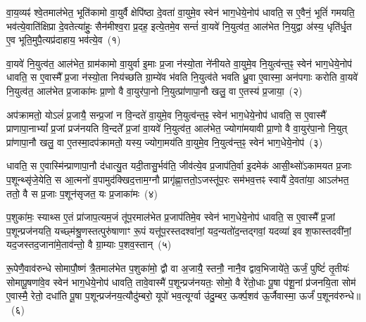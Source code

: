 \setcounter{anuvakam}{0}
वा॒य॒व्यꣴ॑ श्वे॒तमा\-ल॑भेत॒ भूति॑कामो वा॒युर्वै क्षेपि॑ष्ठा दे॒वता॑ वा॒युमे॒व स्वेन॑ भाग॒\-धेये॒नोप॑ धावति॒ स ए॒वैनं॒ भूतिं॑ गमयति॒ भव॑त्ये॒वाति॑क्षिप्रा दे॒वतेत्या॑हुः॒ सैन॑मीश्व॒रा प्र॒दह॒ इत्ये॒तमे॒व सन्तं॑ वा॒यवे॑ नि॒युत्व॑त॒ आल॑भेत नि॒युद्वा अ॑स्य॒ धृति॑र्धृ॒त ए॒व भूति॒मुपै॒त्यप्र॑दाहाय॒ भव॑त्ये॒व~(१)\ip

वा॒यवे॑ नि॒युत्व॑त॒ आ\-ल॑भेत॒ ग्राम॑कामो वा॒युर्वा इ॒माः प्र॒जा न॑स्यो॒ता ने॑नीयते वा॒युमे॒व नि॒युत्व॑न्त॒ꣴ॒ स्वेन॑ भाग॒\-धेये॒नोप॑ धावति॒ स ए॒वास्मै᳚ प्र॒जा न॑स्यो॒ता निय॑च्छति ग्रा॒म्ये॑व भ॑वति नि॒युत्व॑ते भवति ध्रु॒वा ए॒वास्मा॒ अन॑पगाः करोति वा॒यवे॑ नि॒युत्व॑त॒ आल॑भेत प्र॒जाका॑मः प्रा॒णो वै वा॒युर॑पा॒नो नि॒युत्प्रा॑णापा॒नौ खलु॒ वा ए॒तस्य॑ प्र॒जाया॒~(२)\ip

अप॑क्रामतो॒ यो\-ऽलं॑ प्र॒जायै॒ सन्प्र॒जां न वि॒न्दते॑ वा॒युमे॒व नि॒युत्व॑न्त॒ꣴ॒ स्वेन॑ भाग॒\-धेये॒नोप॑ धावति॒ स ए॒वास्मै᳚ प्राणापा॒ना\-भ्यां᳚ प्र॒जां प्रज॑नयति वि॒न्दते᳚ प्र॒जां वा॒यवे॑ नि॒युत्व॑त॒ आ\-ल॑भेत॒ ज्योगा॑मयावी प्रा॒णो वै वा॒युर॑पा॒नो नि॒युत् प्रा॑णापा॒नौ खलु॒ वा ए॒तस्मा॒दप॑क्रामतो॒ यस्य॒ ज्योगा॒मय॑ति वा॒युमे॒व नि॒युत्व॑न्त॒ꣴ॒ स्वेन॑ भाग॒\-धेये॒नोप॑~(३)\ip

धावति॒ स ए॒वास्मि॑न्प्राणापा॒नौ द॑धात्यु॒त यदी॒तासु॒र्भव॑ति॒ जीव॑त्ये॒व प्र॒जा\-प॑ति॒र्वा इ॒दमेक॑ आसी॒थ्सो॑\-ऽकामयत प्र॒जाः प॒शून्थ्सृ॑जे॒येति॒ स आ॒त्मनो॑ व॒पामुद॑क्खिद॒त्ताम॒ग्नौ प्रागृ॑ह्णा॒त्ततो॒\-ऽजस्तू॑प॒रः सम॑भव॒त्तꣴ स्वायै॑ दे॒वता॑या॒ आ\-ऽल॑भत॒ ततो॒ वै स प्र॒जाः प॒शून॑सृजत॒ यः प्र॒जाका॑मः~(४)\ip

प॒शुका॑मः॒ स्याथ्स ए॒तं प्रा॑जाप॒त्यम॒जं तू॑प॒रमाल॑भेत प्र॒जा\-प॑तिमे॒व स्वेन॑ भाग॒\-धेये॒नोप॑ धावति॒ स ए॒वास्मै᳚ प्र॒जां प॒शून्प्रज॑नयति॒ यच्छ्म॑श्रु॒णस्तत्पुरु॑षाणाꣳ रू॒पं यत्तू॑प॒रस्तदश्वा॑नां॒ यद॒न्यतो॑द॒न्तद्गवां॒ यदव्या॑ इव श॒फास्तदवी॑नां॒ यद॒ज\-स्तद॒जाना॑मे॒ताव॑न्तो॒ वै ग्रा॒म्याः प॒शव॒स्तान्~(५)\ip

रू॒पेणै॒वाव॑\-रुन्धे सोमापौ॒ष्णं त्रै॒तमाल॑भेत प॒शुका॑मो॒ द्वौ वा अ॒जायै॒ स्तनौ॒ नानै॒व द्वाव॒भिजाये॑ते॒ ऊर्जं॒ पुष्टिं॑ तृ॒तीयः॑ सोमापू॒षणा॑वे॒व स्वेन॑ भाग॒\-धेये॒नोप॑ धावति॒ तावे॒वास्मै॑ प॒शून्प्रज॑नयतः॒ सोमो॒ वै रे॑तो॒धाः पू॒षा प॑शू॒नां प्र॑जनयि॒ता सोम॑ ए॒वास्मै॒ रेतो॒ दधा॑ति पू॒षा प॒शून्प्रज॑नय॒त्यौदु॑म्बरो॒ यूपो॑ भव॒त्यूर्ग्वा उ॑दु॒म्बर॒ ऊर्क्प॒शव॑ ऊ॒र्जैवास्मा॒ ऊर्जं॑ प॒शूनव॑\-रुन्धे॥~(६)\ip

{\anuvakamend[{भव॑त्ये॒व प्र॒जाया॑ आ॒मय॑ति वा॒युमे॒व नि॒युत्व॑न्त॒ꣴ॒ स्वेन॑ भाग॒\-धेये॒नोप॑ प्र॒जाका॑म॒स्तान् यूप॒स्त्रयो॑दश च।}]}

